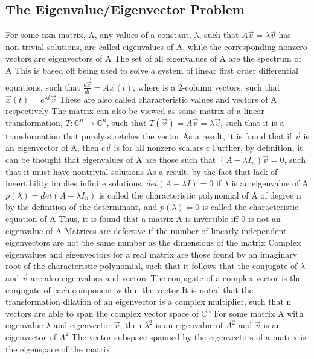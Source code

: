 \documentclass[11 pt, twoside]{article}
\newenvironment{outline*}
{
	\begin{outline}[enumerate]
	}
	{\end{outline}
}
\begin{document}
\subsection{The Eigenvalue/Eigenvector Problem}
\begin{outline*}
\1 For some nxn matrix, A, any values of a constant, $\lambda$, such that $A\vec{v} = \lambda\vec{v}$ has non-trivial solutions, are called eigenvalues of A, while the corresponding nonzero vectors are eigenvectors of A
\2 The set of all eigenvalues of A are the spectrum of A
\2 This is based off being used to solve a system of linear first order differential equations, such that $\vec{\frac{d\vec{x}}{dt}} = A\vec{x}(t)$, where  is a 2-column vectors, such that $\vec{x}(t) = e^{\lambda t}\vec{v}$
\2 These are also called characteristic values and vectors of A respectively
\2 The matrix can also be viewed as some matrix of a linear transformation, $T: \mathbb{C}^n \to \mathbb{C}^n$, such that $T(\vec{v}) = A\vec{v} = \lambda \vec{v}$, such that it is a transformation that purely stretches the vector
\3 As a result, it is found that if $\vec{v}$ is an eigenvector of A, then $c\vec{v}$ is for all nonzero scalars c
\2 Further, by definition, it can be thought that eigenvalues of A are those such that $(A - \lambda I_n)\vec{v} = 0$, such that it must have nontrivial solutions
\3 As a result, by the fact that lack of invertibility implies infinite solutions, $det(A - \lambda I) = 0$ if $\lambda$ is an eigenvalue of A
\3 $p(\lambda) = det(A - \lambda I_n)$ is called the characteristic polynomial of A of degree n by the definition of the determinant, and $p(\lambda) = 0$ is called the characteristic equation of A
\3 Thus, it is found that a matrix A is invertible iff 0 is not an eigenvalue of A
\2 Matrices are defective if the number of linearly independent eigenvectors are not the same number as the dimensions of the matrix
\2 Complex eigenvalues and eigenvectors for a real matrix are those found by an imaginary root of the characteristic polynomial, such that it follows that the conjugate of $\lambda$ and $\vec{v}$ are also eigenvalues and vectors
\3 The conjugate of a complex vector is the conjugate of each component within the vector
\3 It is noted that the transformation dilation of an eigenvector is a complex multiplier, such that n vectors are able to span the complex vector space of $\mathbb{C}^n$
\2 For some matrix A with eigenvalue $\lambda$ and eigenvector $\vec{v}$, then $\lambda^2$ is an eigenvalue of $A^2$ and $\vec{v}$ is an eigenvector of $A^2$
\1 The vector subspace spanned by the eigenvectors of a matrix is the eigenspace of the matrix
\end{outline*}
\end{document}
